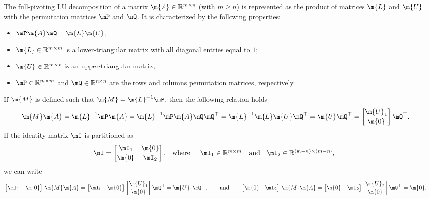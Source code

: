 The full-pivoting \ac{LU} decomposition of a matrix $\m{A} \in \mathbb{R}^{m \times n}$ (with $m\geq n$) is represented as the product of matrices $\m{L}$ and $\m{U}$ with the permutation matrices $\mP$ and $\mQ$. It is characterized by the following properties:
%
\begin{itemize}
  \setlength{\itemsep}{0.0em}
  \item $\mP\m{A}\mQ = \m{L}\m{U}$;
  \item $\m{L} \in \mathbb{R}^{m \times m}$ is a lower-triangular matrix with all diagonal entries equal to $1$;
  \item $\m{U} \in \mathbb{R}^{m \times n}$ is an upper-triangular matrix;
  \item $\mP \in \mathbb{R}^{m \times m}$ and $\mQ \in \mathbb{R}^{n \times n}$ are the rows and columns permutation matrices, respectively.
\end{itemize}
%
If $\m{M}$ is defined such that $\m{M} = \m{L}^{-1}\mP$, then the following relation holds
%
\begin{equation}
    \m{M}\m{A}
    = \m{L}^{-1}\mP\m{A}
    = \m{L}^{-1}\mP\m{A}\mQ\mQ^\top
    = \m{L}^{-1}\m{L}\m{U}\mQ^\top
    = \m{U}\mQ^\top
    = \begin{bmatrix} \m{U}_1 \\[0.2em] \m{0} \end{bmatrix}\mQ^\top \text{.}
\end{equation}
%
If the identity matrix $\mI$ is partitioned as
%
\begin{equation}
  \mI = \begin{bmatrix}
    \mI_1 & \m{0} \\[0.2em]
    \m{0} & \mI_2
  \end{bmatrix} \text{,}
  \quad \text{where} \quad
  \begin{array}{l}
    \mI_1 \in \mathbb{R}^{m \times m} \quad \text{and} \quad
    \mI_2 \in \mathbb{R}^{(m-n)\times(m-n)}\text{,}
  \end{array}
\end{equation}
%
we can write
%
\begin{equation}
  \begin{bmatrix} \mI_1 & \m{0} \end{bmatrix} \, \m{M}\m{A} =
  \begin{bmatrix} \mI_1 & \m{0} \end{bmatrix}
  \begin{bmatrix} \m{U}_1 \\[0.2em] \m{0} \end{bmatrix} \mQ^\top = \m{U}_1 \mQ^\top
  , \qquad \text{and} \qquad
  \begin{bmatrix} \m{0} & \mI_2 \end{bmatrix} \, \m{M}\m{A} =
  \begin{bmatrix} \m{0} & \mI_2 \end{bmatrix}
  \begin{bmatrix} \m{U}_2 \\[0.2em] \m{0} \end{bmatrix} \mQ^\top = \m{0} \text{.}
\end{equation}
